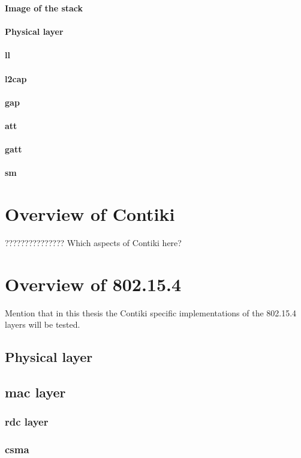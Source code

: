 \textbf{Image of the stack}

\paragraph{Physical layer}
\paragraph{\acrfull{ll}}
\paragraph{\gls{l2cap}}
\paragraph{\gls{gap}}
\paragraph{\gls{att}}
\paragraph{\gls{gatt}}
\paragraph{\gls{sm}}

\section{Overview of Contiki}
??????????????? Which aspects of Contiki here?

\section{Overview of 802.15.4}
Mention that in this thesis the Contiki specific implementations of the 802.15.4 layers will be tested.

\subsection{Physical layer}

\subsection{\gls{mac} layer}
\subsubsection{\gls{rdc} layer}
\subsubsection{\gls{csma}}



